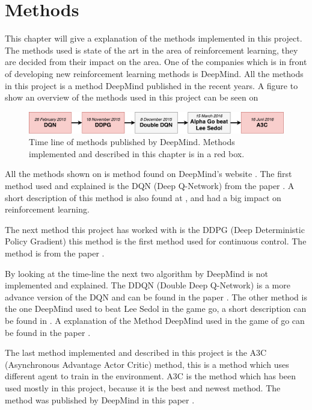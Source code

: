 \chapter{Methods}
\label{chap:projectdef}
This chapter will give a explanation of the methods implemented in this project. The methods used is state of the art in the area of reinforcement learning, they are decided from their impact on the area. One of the companies which is in front of developing new reinforcement learning methods is DeepMind. All the methods in this project is a method DeepMind published in the recent years. A figure to show an overview of the methods used in this project can be seen on     

\begin{figure}[H]
	\centering
	\includegraphics[width=1.25\textwidth]{Figures/Architecture/Methods_deepmind.pdf}
	\caption{Time line of methods published by DeepMind. Methods implemented and described in this chapter is in a red box.  }
	\label{fig:Methods_deepmind}
\end{figure}

All the methods shown on  is method found on DeepMind's website \cite{Publications_Deepmind}. The first method used and explained is the DQN (Deep Q-Network) from the paper \cite{DBLP:journals/corr/MnihKSGAWR13}. A short description of this method is also found at , and had a big impact on reinforcement learning.    

The next method this project has worked with is the DDPG (Deep Deterministic Policy Gradient) this method is the first method used for continuous control. The method is from the paper \cite{DBLP:journals/corr/LillicrapHPHETS15}.

By looking at the time-line the next two algorithm by DeepMind is not implemented and explained. The DDQN (Double Deep Q-Network) is a more advance version of the DQN and can be found in the paper \cite{DBLP:journals/corr/HasseltGS15}. The other method is the one DeepMind used to beat Lee Sedol in the game go, a short description can be found in . A explanation of the Method DeepMind used in the game of go can be found in the paper \cite{Silver_2016}.

The last method implemented and described in this project is the A3C (Asynchronous Advantage Actor Critic) method, this is a method which uses different agent to train in the environment. A3C is the method which has been used mostly in this project, because it is the best and newest method. The method was published by DeepMind in this paper \cite{DBLP:journals/corr/MnihBMGLHSK16}. 

